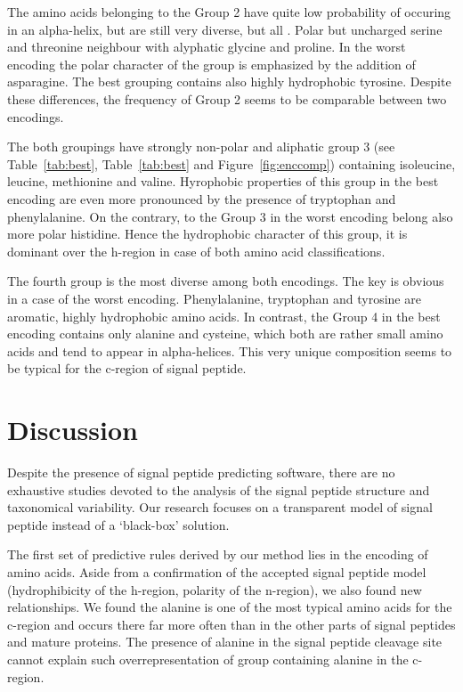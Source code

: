 \documentclass[fleqn,10pt,twoside]{gcb15submission}
\begin{document}
The amino acids belonging to the Group 2 have quite low probability of occuring in an alpha-helix, but are still very diverse, but all . Polar but uncharged serine and threonine neighbour with alyphatic glycine and proline. In the worst encoding the polar character of the group is emphasized by the addition of asparagine. The best grouping contains also highly hydrophobic tyrosine. Despite these differences, the frequency of Group 2 seems to be comparable between two encodings.

The both groupings have strongly non-polar and aliphatic group 3 (see Table~\ref{tab:best}, Table~\ref{tab:best} and Figure~\ref{fig:enccomp}) containing isoleucine, leucine, methionine and valine. Hyrophobic properties of this group in the best encoding are even more pronounced by the presence of tryptophan and phenylalanine. On the contrary, to the Group 3 in the worst encoding belong also more polar histidine. Hence the hydrophobic character of this group, it is dominant over the h-region in case of both amino acid classifications.

The fourth group is the most diverse among both encodings. The key is obvious in a case of the worst encoding. Phenylalanine, tryptophan and tyrosine are aromatic, highly hydrophobic amino acids. In contrast, the Group 4 in the best encoding contains only alanine and cysteine, which both are rather small amino acids and tend to appear in alpha-helices. This very unique composition seems to be typical for the c-region of signal peptide.

\section*{Discussion}

Despite the presence of signal peptide predicting software, there are no exhaustive studies devoted to the analysis of the signal peptide structure and taxonomical variability. Our research focuses on a transparent model of signal peptide instead of a ‘black-box’ solution.

The first set of predictive rules derived by our method lies in the encoding of amino acids. Aside from a confirmation of the accepted signal peptide model (hydrophibicity of the h-region, polarity of the n-region), we also found new relationships. We found the alanine is one of the most typical amino acids for the c-region and occurs there far more often than in the other parts of signal peptides and mature proteins. The presence of alanine in the signal peptide cleavage site~\cite{1986vonheijnea} cannot explain such overrepresentation of group containing alanine in the c-region.
\end{document}
